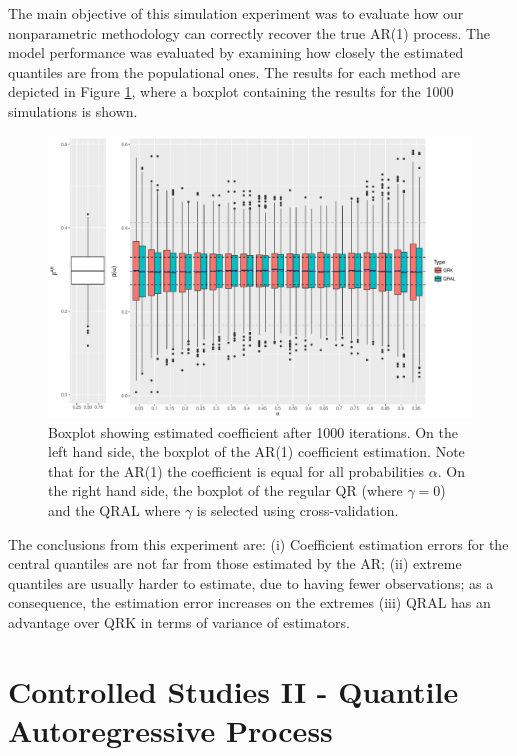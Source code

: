 The main objective of this simulation experiment was to evaluate how our nonparametric methodology can correctly recover the true AR(1) process. The model performance was evaluated by examining how closely the estimated quantiles are from the populational ones. The results for each method are depicted in Figure \ref{fig:boxplot-ar1}, where a boxplot containing the results for the 1000 simulations is shown. %
\begin{figure}[h]
	\centering
	\centerline{\includegraphics[width=7in]{Images/boxplot-ar1.pdf}}
	\caption{Boxplot showing estimated coefficient after 1000 iterations. On the left hand side, the boxplot of the AR(1) coefficient estimation. Note that for the AR(1) the coefficient is equal for all probabilities $\alpha$. On the right hand side, the boxplot of the regular QR (where $\gamma = 0$) and the QRAL where $\gamma$ is selected using cross-validation. }
	\label{fig:boxplot-ar1}
\end{figure}
The conclusions from this experiment are: (i) Coefficient estimation errors for the central quantiles are not far from those estimated by the AR; (ii) extreme quantiles are usually harder to estimate, due to having fewer observations; as a consequence, the estimation error increases on the extremes (iii) QRAL has an advantage over QRK in terms of variance of estimators.


\section{Controlled Studies II - Quantile Autoregressive Process} \label{sec:qar-study}

